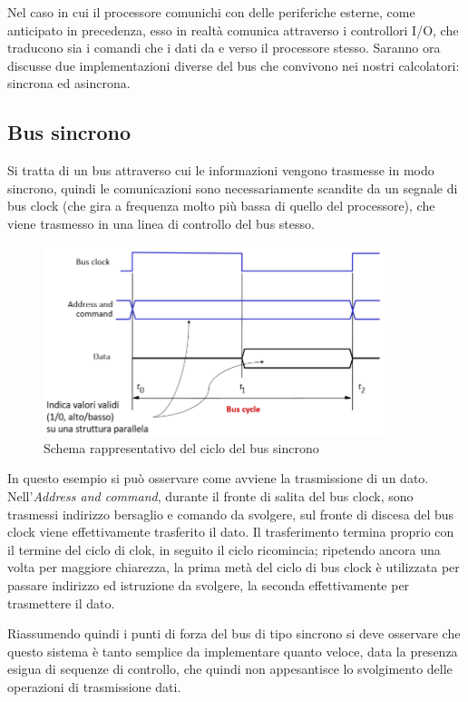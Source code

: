 \documentclass[class=book, crop=false, oneside]{standalone}
\begin{document}
Nel caso in cui il processore comunichi con delle periferiche esterne, come anticipato in precedenza, esso in realtà comunica attraverso i controllori I/O, che traducono sia i comandi che i dati da e verso il processore stesso.
Saranno ora discusse due implementazioni diverse del bus che convivono nei nostri calcolatori: sincrona ed asincrona.

\subsection{Bus sincrono}
Si tratta di un bus attraverso cui le informazioni vengono trasmesse in modo sincrono, quindi le comunicazioni sono necessariamente scandite da un segnale di bus clock (che gira a frequenza molto più bassa di quello del processore), che viene trasmesso in una linea di controllo del bus stesso.

\begin{figure}[H]
	\centering
	\includegraphics[width=0.9\textwidth,keepaspectratio]{bus-sincrono}
	\caption{Schema rappresentativo del ciclo del bus sincrono}
\end{figure}

In questo esempio si può osservare come avviene la trasmissione di un dato.
Nell'\emph{Address and command}, durante il fronte di salita del bus clock, sono trasmessi indirizzo bersaglio e comando da svolgere, sul fronte di discesa del bus clock viene effettivamente trasferito il dato.
Il trasferimento termina proprio con il termine del ciclo di clok, in seguito il ciclo ricomincia; ripetendo ancora una volta per maggiore chiarezza, la prima metà del ciclo di bus clock è utilizzata per passare indirizzo ed istruzione da svolgere, la seconda effettivamente per trasmettere il dato.

Riassumendo quindi i punti di forza del bus di tipo sincrono si deve osservare che questo sistema è tanto semplice da implementare quanto veloce, data la presenza esigua di sequenze di controllo, che quindi non appesantisce lo svolgimento delle operazioni di trasmissione dati.
\end{document}
